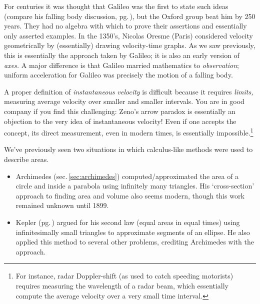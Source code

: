 For centuries it was thought that Galileo was the first to state such ideas (compare his falling body discussion, pg.\,\pageref{pg:galileo}), but the Oxford group beat him by 250 years. They had no algebra with which to prove their assertions and essentially only asserted examples. %
\smallbreak
In the 1350's, Nicolas Oresme (Paris) considered velocity geometrically by (essentially) drawing velocity-time graphs. As we saw previously, this is essentially the approach taken by Galileo; it is also an early version of \emph{axes.} A major difference is that Galileo married mathematics to \emph{observation}; uniform acceleration for Galileo was precisely the motion of a falling body.
\smallbreak


A proper definition of \emph{instantaneous velocity} is difficult because it requires \emph{limits,} measuring average velocity over smaller and smaller intervals. You are in good company if you find this challenging: Zeno's arrow paradox is essentially an objection to the very idea of instantaneous velocity! Even if one accepts the concept, its direct measurement, even in modern times, is essentially impossible.\footnote{For instance, radar Doppler-shift (as used to catch speeding motorists) requires measuring the wavelength of a radar beam, which essentially compute the average velocity over a very small time interval. %
}\smallbreak


We've previously seen two situations in which calculus-like methods were used to describe areas.
\begin{itemize}
  \item Archimedes (sec.\,\ref{sec:archimedes}) computed/approximated the area of a circle and inside a parabola using infinitely many triangles. His `cross-section' approach to finding area and volume also seems modern, though this work remained unknown until 1899.
  \item Kepler (pg.\,\pageref{pg:kepler2}) argued for his second law (equal areas in equal times) using infinitesimally small triangles to approximate segments of an ellipse. He also applied this method to several other problems, crediting Archimedes with the approach.
\end{itemize}

